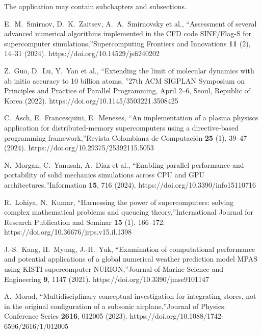 \documentclass[
11pt,%
tightenlines,%
twoside,%
onecolumn,%
nofloats,%
nobibnotes,%
nofootinbib,%
superscriptaddress,%
noshowpacs,%
centertags]%
{revtex4}
\begin{document}
The application may contain subchapters and subsections.


%
%

\begin{thebibliography}{99}

E.~M.~Smirnov, D.~K.~Zaitsev, A.~A.~Smirnovsky et al., \textquotedblleft Assessment of several advanced numerical algorithms implemented in the CFD code SINF/Flag-S for supercomputer simulations,\textquotedblright Supercomputing Frontiers and Innovations \textbf{11} (2), 14--31 (2024). https://doi.org/10.14529/jsfi240202

Z.~Guo, D.~Lu, Y.~Yan et al., \textquotedblleft Extending the limit of molecular dynamics with ab initio accuracy to 10 billion atoms, \textquotedblright 27th ACM SIGPLAN Symposium on Principles and Practice of Parallel Programming, April 2--6, Seoul, Republic of Korea (2022). https://doi.org/10.1145/3503221.3508425

C.~Asch, E.~Francesquini, E.~Meneses, \textquotedblleft An implementation of a plasma physiscs application for distributed-memory supercomputers using a directive-based programming framework,\textquotedblright Revista Colombiana de Computaci\'on \textbf{25} (1), 39--47 (2024). https://doi.org/10.29375/25392115.5053

N.~Morgan, C.~Yanusah, A.~Diaz et al., \textquotedblleft Enabling parallel performance and portability of solid mechanics simulations across CPU and GPU architectures,\textquotedblright Information \textbf{15}, 716 (2024). https://doi.org/10.3390/info15110716

R.~Lohiya, N.~Kumar, \textquotedblleft Harnessing the power of supercomputers: solving complex mathematical problems and queueing theory,\textquotedblright International Journal for Research Publication and Seminar \textbf{15} (1), 166--172. https://doi.org/10.36676/jrps.v15.il.1398

J.-S.~Kang, H.~Myung, J.-H.~Yuk, \textquotedblleft Examination of computational performance and potential applications of a global numerical weather prediction model MPAS using KISTI supercomputer NURION,\textquotedblright Journal of Marine Science and Engineering \textbf{9}, 1147 (2021). https://doi.org/10.3390/jmse9101147

A.~Morad, \textquotedblleft Multidisciplinary conceptual investigation for integrating stores, not in the original configuration of a subsonic airplane,\textquotedblright Journal of Physics: Conference Series \textbf{2616}, 012005 (2023). https://doi.org/10.1088/1742-6596/2616/1/012005


\end{thebibliography}
\end{document}
